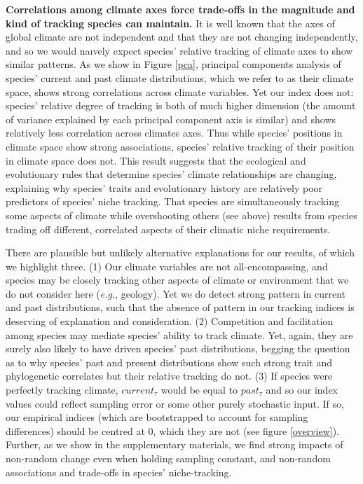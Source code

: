 \documentclass[12pt]{report}
\newcommand{\eg}{\emph{e.g.}\xspace}
\begin{document}
\textbf{Correlations among climate axes force trade-offs in the
  magnitude and kind of tracking species can maintain.} It is well
known that the axes of global climate are not independent and that
they are not changing independently\supercite{Harris2014,IPCC2014},
and so we would na\i vely expect species' relative tracking of climate
axes to show similar patterns. As we show in Figure \ref{pca},
principal components analysis of species' current and past climate
distributions, which we refer to as their climate space, shows strong
correlations across climate variables. Yet our index does not:
species' relative degree of tracking is both of much higher dimension
(the amount of variance explained by each principal component axis is
similar) and shows relatively less correlation across climates
axes. Thus while species' positions in climate space show strong
associations, species' relative tracking of their position in climate
space does not. This result suggests that the ecological and
evolutionary rules that determine species' climate relationships are
changing, explaining why species' traits and evolutionary history are
relatively poor predictors of species' niche tracking. That species
are simultaneously tracking some aspects of climate while overshooting
others (see above) results from species trading off different,
correlated aspects of their climatic niche requirements. 

There are plausible but unlikely alternative explanations for our
results, of which we highlight three. (1) Our climate variables are
not all-encompassing, and species may be closely tracking other
aspects of climate or environment that we do not consider here (\eg,
geology). Yet we do detect strong pattern in current and past
distributions, such that the absence of pattern in our tracking
indices is deserving of explanation and consideration. (2) Competition
and facilitation among species may mediate species' ability to track
climate\supercite{Davis1999}. Yet, again, they are surely also likely
to have driven species' past distributions, begging the question as to
why species' past and present distributions show such strong trait and
phylogenetic correlates but their relative tracking do not. (3) If
species were perfectly tracking climate, $current_\tau$ would be equal
to $past_\tau$ and so our index values could reflect sampling error or
some other purely stochastic input. If so, our empirical indices
(which are bootstrapped to account for sampling differences) should be
centred at 0, which they are not (see figure \ref{overview}). Further,
as we show in the supplementary materials, we find strong impacts of
non-random change even when holding sampling constant, and non-random
associations and trade-offs in species' niche-tracking.
\end{document}
